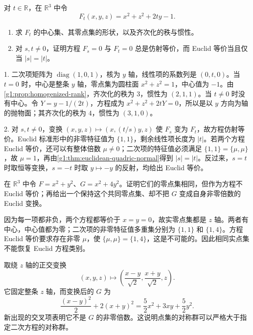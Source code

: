 \begin{exercise}
	\label{g1:ex:paraboloid-parameter}
	对 \(t\in\mathbb R\)，在 \(\mathbb R^3\) 中令
	\[
		F_t(x,y,z)=x^2+z^2+2ty-1.
	\]
	\begin{enumerate}
		\item 求 \(F_t\) 的中心集、其零点集的形状，以及齐次化的秩与惯性。
		\item 对 \(s,t\ne0\)，证明方程 \(F_s=0\) 与 \(F_t=0\) 总是仿射等价，而 Euclid 等价当且仅当 \(|s|=|t|\)。
	\end{enumerate}
\end{exercise}
\begin{solution}
	1. 二次项矩阵为 \(\operatorname{diag}(1,0,1)\)，核为 \(y\) 轴，线性项的系数列是 \((0,t,0)\)。当 \(t=0\) 时，中心是整条 \(y\) 轴，零点集为圆柱面 \(x^2+z^2=1\)，中心值为 \(-1\)。由\cref{g1:prop:homogenized-rank}，齐次化的秩为 \(3\)，惯性为 \((2,1,1)\)。当 \(t\ne0\) 时没有中心。令 \(Y=y-1/(2t)\)，方程成为 \(x^2+z^2+2tY=0\)，所以是以 \(y\) 方向为轴的抛物面；其齐次化的秩为 \(4\)，惯性为 \((3,1,0)\)。

	2. 对 \(s,t\ne0\)，变换 \((x,y,z)\mapsto(x,(t/s)y,z)\) 使 \(F_s\) 变为 \(F_t\)，故方程仿射等价。Euclid 标准形中的非零特征值为 \(\{1,1\}\)，剩余线性项长度为 \(|t|\)。若两个方程 Euclid 等价，还可以有整体倍数 \(\mu\ne0\)；二次项的特征值必须满足 \(\{1,1\}=\{\mu,\mu\}\)，故 \(\mu=1\)，再由\cref{g1:thm:euclidean-quadric-normal}得到 \(|s|=|t|\)。反过来，\(s=t\) 时取恒等变换，\(s=-t\) 时取 \(y\mapsto-y\) 的反射，均给出 Euclid 等价。
\end{solution}

\begin{exercise}
	\label{g1:ex:quadric-locus-information}
	在 \(\mathbb R^3\) 中令 \(F=x^2+y^2\)、\(G=x^2+4y^2\)。证明它们的零点集相同，但作为方程不 Euclid 等价；再给出一个保持这个共同零点集、却不把 \(G\) 变成自身非零倍数的 Euclid 变换。
\end{exercise}
\begin{solution}
	因为每一项都非负，两个方程都等价于 \(x=y=0\)，故实零点集都是 \(z\) 轴。两者有中心，中心值都为零；二次项的非零特征值多重集分别为 \(\{1,1\}\) 和 \(\{1,4\}\)。方程 Euclid 等价要求存在非零 \(\mu\)，使 \(\{\mu,\mu\}=\{1,4\}\)，这是不可能的。因此相同实点集不能恢复 Euclid 方程类别。

	取绕 \(z\) 轴的正交变换
	\[
		(x,y,z)\longmapsto
		\left(\frac{x-y}{\sqrt2},\frac{x+y}{\sqrt2},z\right).
	\]
	它固定整条 \(z\) 轴，而变换后的 \(G\) 为
	\[
		\frac{(x-y)^2}{2}+2(x+y)^2
		=\frac52x^2+3xy+\frac52y^2.
	\]
	新出现的交叉项表明它不是 \(G\) 的非零倍数。这说明点集的对称群可以严格大于指定二次方程的对称群。
\end{solution}


